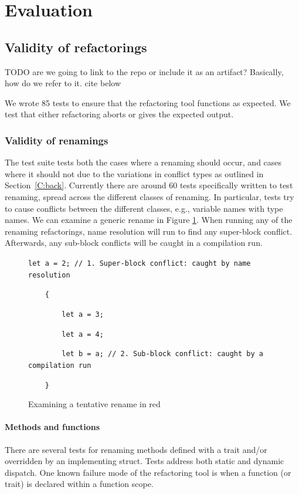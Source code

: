 \section{Evaluation}\label{C:eval}

\subsection{Validity of refactorings}\label{S:validity}

TODO are we going to link to the repo or include it as an artifact? Basically, how do we refer to it. cite below

We wrote 85 tests to ensure that the refactoring tool functions as expected. We test that either refactoring aborts or gives the expected output.

\subsubsection{Validity of renamings}

The test suite tests both the cases where a renaming should occur, and cases where it should not due to the variations in conflict types as outlined in Section~\ref{C:back}. Currently there are around 60 tests specifically written to test renaming, spread across the different classes of renaming. In particular, tests try to cause conflicts between the different classes, e.g., variable names with type names. We can examine a generic rename in Figure \ref{Fig:walk}. When running any of the renaming refactorings, name resolution will run to find any super-block conflict. Afterwards, any sub-block conflicts will be caught in a compilation run. 

\begin{figure}
{\verb|let a = 2; // 1. Super-block conflict: caught by name resolution|}

{\verb|    {|}

{\verb|        let |}{\color{red}\verb|a|}{\verb| = 3;|}

{\verb|        let a = 4;|}

{\verb|        let b = |}{\color{red}\verb|a|}{\verb|; // 2. Sub-block conflict: caught by a compilation run|}

{\verb|    }|}
\caption{Examining a tentative rename in red}
\label{Fig:walk}
\end{figure}

\paragraph{Methods and functions}
There are several tests for renaming methods defined with a trait and/or overridden by an implementing struct. Tests address both static and dynamic dispatch. One known failure mode of the refactoring tool is when a function (or trait) is declared within a function scope.

